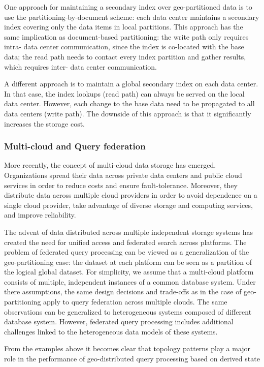 One approach for maintaining a secondary index over geo-partitioned data is to use the partitioning-by-document scheme:
each data center maintains a secondary index covering only the data items in local partitions.
This approach has the same implication as document-based partitioning:
the write path only requires intra- data center communication, since the index is co-located with the base data;
the read path needs to contact every index partition and gather results, which requires inter- data center
communication.

A different approach is to maintain a global secondary index on each data center.
In that case, the index lookups (read path) can always be served on the local data center.
However, each change to the base data need to be propagated to all data centers (write path).
The downside of this approach is that it significantly increases the storage cost.

\subsubsection{Multi-cloud and Query federation}
More recently, the concept of multi-cloud data storage has emerged.
Organizations spread their data across private data centers and public cloud services in order to reduce costs and
ensure fault-tolerance.
Moreover, they distribute data across multiple cloud providers in order to avoid dependence on a single
cloud provider, take advantage of diverse storage and computing services, and improve reliability.

The advent of data distributed across multiple independent storage systems has created the need for unified access and
federated search across platforms.
The problem of federated query processing can be viewed as a generalization of the geo-partitioning case:
the dataset at each platform can be seen as a partition of the logical global dataset.
For simplicity, we assume that a multi-cloud platform consists of multiple, independent instances of a common database
system.
Under there assumptions, the same design decisions and trade-offs as in the case of geo-partitioning apply to query
federation across multiple clouds.
The same observations can be generalized to heterogeneous systems composed of different database system.
However, federated query processing includes additional challenges linked to the heterogeneous data models of these
systems.

From the examples above it becomes clear that topology patterns play a major role in the performance of geo-distributed
query processing based on derived state

